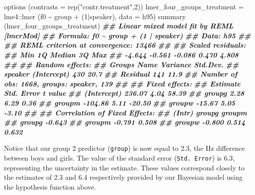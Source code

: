 \documentclass[
]{book}
\newenvironment{Shaded}{\begin{snugshade}}{\end{snugshade}}
\newcommand{\AttributeTok}[1]{\textcolor[rgb]{0.77,0.63,0.00}{#1}}
\newcommand{\DecValTok}[1]{\textcolor[rgb]{0.00,0.00,0.81}{#1}}
\newcommand{\DocumentationTok}[1]{\textcolor[rgb]{0.56,0.35,0.01}{\textbf{\textit{#1}}}}
\newcommand{\FunctionTok}[1]{\textcolor[rgb]{0.00,0.00,0.00}{#1}}
\newcommand{\NormalTok}[1]{#1}
\newcommand{\OtherTok}[1]{\textcolor[rgb]{0.56,0.35,0.01}{#1}}
\newcommand{\SpecialCharTok}[1]{\textcolor[rgb]{0.00,0.00,0.00}{#1}}
\newcommand{\StringTok}[1]{\textcolor[rgb]{0.31,0.60,0.02}{#1}}
\begin{document}
\begin{Shaded}
\begin{Highlighting}[]
\FunctionTok{options}\NormalTok{ (}\AttributeTok{contrasts =} \FunctionTok{rep}\NormalTok{(}\StringTok{"contr.treatment"}\NormalTok{,}\DecValTok{2}\NormalTok{))}
\NormalTok{lmer\_four\_groups\_treatment }\OtherTok{=}\NormalTok{ lme4}\SpecialCharTok{::}\FunctionTok{lmer}\NormalTok{ (f0 }\SpecialCharTok{\textasciitilde{}}\NormalTok{ group }\SpecialCharTok{+}\NormalTok{ (}\DecValTok{1}\SpecialCharTok{|}\NormalTok{speaker), }\AttributeTok{data =}\NormalTok{ h95)}
\FunctionTok{summary}\NormalTok{ (lmer\_four\_groups\_treatment)}
\DocumentationTok{\#\# Linear mixed model fit by REML [\textquotesingle{}lmerMod\textquotesingle{}]}
\DocumentationTok{\#\# Formula: f0 \textasciitilde{} group + (1 | speaker)}
\DocumentationTok{\#\#    Data: h95}
\DocumentationTok{\#\# }
\DocumentationTok{\#\# REML criterion at convergence: 13466}
\DocumentationTok{\#\# }
\DocumentationTok{\#\# Scaled residuals: }
\DocumentationTok{\#\#    Min     1Q Median     3Q    Max }
\DocumentationTok{\#\# {-}4.644 {-}0.561 {-}0.086  0.470  4.808 }
\DocumentationTok{\#\# }
\DocumentationTok{\#\# Random effects:}
\DocumentationTok{\#\#  Groups   Name        Variance Std.Dev.}
\DocumentationTok{\#\#  speaker  (Intercept) 430      20.7    }
\DocumentationTok{\#\#  Residual             141      11.9    }
\DocumentationTok{\#\# Number of obs: 1668, groups:  speaker, 139}
\DocumentationTok{\#\# }
\DocumentationTok{\#\# Fixed effects:}
\DocumentationTok{\#\#             Estimate Std. Error t value}
\DocumentationTok{\#\# (Intercept)   236.07       4.04   58.39}
\DocumentationTok{\#\# groupg          2.28       6.29    0.36}
\DocumentationTok{\#\# groupm       {-}104.86       5.11  {-}20.50}
\DocumentationTok{\#\# groupw        {-}15.67       5.05   {-}3.10}
\DocumentationTok{\#\# }
\DocumentationTok{\#\# Correlation of Fixed Effects:}
\DocumentationTok{\#\#        (Intr) groupg groupm}
\DocumentationTok{\#\# groupg {-}0.643              }
\DocumentationTok{\#\# groupm {-}0.791  0.508       }
\DocumentationTok{\#\# groupw {-}0.800  0.514  0.632}
\end{Highlighting}
\end{Shaded}

Notice that our group 2 predictor (\texttt{group}) is now equal to 2.3, the Hz difference between boys and girls. The value of the standard error (\texttt{Std.\ Error}) is 6.3, representing the uncertainty in the estimate. These values correspond closely to the estimates of 2.3 and 6.4 respectively provided by our Bayesian model using the hypothesis function above.
\end{document}

